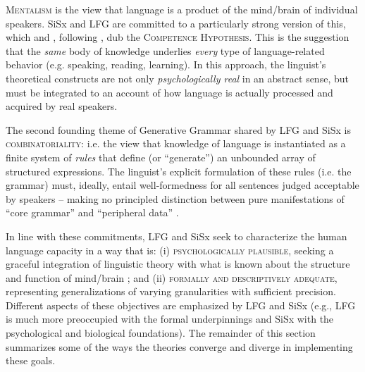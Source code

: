 \documentclass[output=paper,hidelinks]{langscibook}
\begin{document}
\textsc{Mentalism} is the view that language is a product of the mind/brain of individual speakers. SiSx and LFG are committed to a particularly strong version of this, which \citet{bresnan1982introduction} and \citet{kaplanbresnan82}, following \citet[9]{chomsky1965aspects}, dub the \textsc{Competence Hypothesis}. This is the suggestion that the \textit{same} body of knowledge underlies \textit{every} type of language-related behavior (e.g. speaking, reading, learning).  In this approach, the linguist's theoretical constructs are not only \textit{psychologically real} in an abstract sense, but must be integrated to an account of how language is actually processed and acquired by real speakers. %

The second founding theme of Generative Grammar shared by LFG and SiSx is \textsc{combinatoriality}: i.e. the view that knowledge of language is instantiated as a finite system of \textit{rules} that define (or ``generate'') an unbounded array of structured expressions. The linguist's explicit formulation of these rules (i.e. the grammar) must, ideally, entail well-formedness for all sentences judged acceptable by speakers -- making no principled distinction between pure manifestations of ``core grammar'' and ``peripheral data'' \citep{culicover1999syntactic}. %



In line with these commitments, LFG and SiSx seek to characterize the human language capacity in a way that is: (i) \textsc{psychologically plausible}, seeking a graceful integration of linguistic theory with what is known about the structure and function of mind/brain \citep{bresnan1978a-realistic, jackendoff2011what}; and (ii) \textsc{formally and descriptively adequate}, representing generalizations of varying granularities with sufficient precision. Different aspects of these objectives are emphasized by LFG and SiSx (e.g., LFG is much more preoccupied with the formal underpinnings and SiSx with the psychological and biological foundations). The remainder of this section summarizes some of the ways the theories converge and diverge in implementing these goals. %
\end{document}
